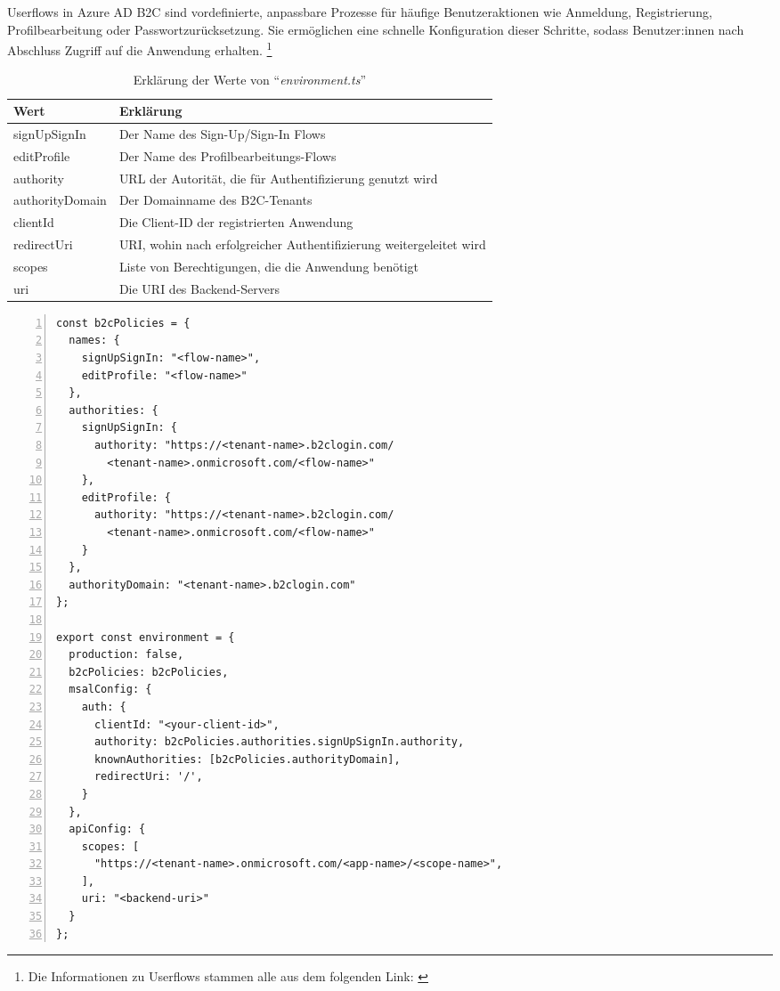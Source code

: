 Userflows in Azure AD B2C sind vordefinierte, anpassbare Prozesse für häufige Benutzeraktionen 
wie Anmeldung, Registrierung, Profilbearbeitung oder Passwortzurücksetzung. Sie ermöglichen 
eine schnelle Konfiguration dieser Schritte, sodass Benutzer:innen nach Abschluss Zugriff auf 
die Anwendung erhalten.
\footnote{Die Informationen zu Userflows stammen alle aus dem folgenden Link: \cite{MicrosoftCorporationn}}

\begin{table}[h t]
  \centering
  \caption{Erklärung der Werte von ``\emph{environment.ts}''}
  \label{tab:environment-ts}
  \begin{tabular}{|l|l|}
  \hline
  \textbf{Wert}   & \textbf{Erklärung}                                                  \\ \hline
  signUpSignIn    & Der Name des Sign-Up/Sign-In Flows                                  \\ \hline
  editProfile     & Der Name des Profilbearbeitungs-Flows                               \\ \hline
  authority       & URL der Autorität, die für Authentifizierung genutzt wird           \\ \hline
  authorityDomain & Der Domainname des B2C-Tenants                                      \\ \hline
  clientId        & Die Client-ID der registrierten Anwendung                           \\ \hline
  redirectUri     & URI, wohin nach erfolgreicher Authentifizierung weitergeleitet wird \\ \hline
  scopes          & Liste von Berechtigungen, die die Anwendung benötigt                \\ \hline
  uri             & Die URI des Backend-Servers                                         \\ \hline
  \end{tabular}
\end{table}

\begin{lstlisting}[numbers=left,caption={environment.ts},label={lst:environment-ts}]
const b2cPolicies = {
  names: {
    signUpSignIn: "<flow-name>",
    editProfile: "<flow-name>"
  },
  authorities: {
    signUpSignIn: {
      authority: "https://<tenant-name>.b2clogin.com/
        <tenant-name>.onmicrosoft.com/<flow-name>"
    },
    editProfile: {
      authority: "https://<tenant-name>.b2clogin.com/
        <tenant-name>.onmicrosoft.com/<flow-name>"
    }
  },
  authorityDomain: "<tenant-name>.b2clogin.com"
};
    
export const environment = {
  production: false,
  b2cPolicies: b2cPolicies,
  msalConfig: {
    auth: {
      clientId: "<your-client-id>",
      authority: b2cPolicies.authorities.signUpSignIn.authority,
      knownAuthorities: [b2cPolicies.authorityDomain],
      redirectUri: '/',
    }
  },
  apiConfig: {
    scopes: [
      "https://<tenant-name>.onmicrosoft.com/<app-name>/<scope-name>",
    ],
    uri: "<backend-uri>"
  }
};    
\end{lstlisting}

